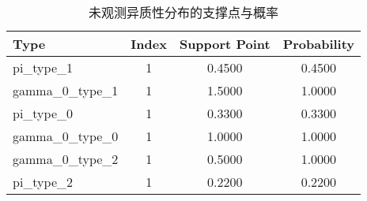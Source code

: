 \begin{table}[htbp]
\centering
\caption{未观测异质性分布的支撑点与概率}
\begin{tabular}{lccc}
\toprule
Type & Index & Support Point & Probability \\
\midrule
pi_type_1 & 1 & 0.4500 & 0.4500 \\
gamma_0_type_1 & 1 & 1.5000 & 1.0000 \\
pi_type_0 & 1 & 0.3300 & 0.3300 \\
gamma_0_type_0 & 1 & 1.0000 & 1.0000 \\
gamma_0_type_2 & 1 & 0.5000 & 1.0000 \\
pi_type_2 & 1 & 0.2200 & 0.2200 \\
\bottomrule
\end{tabular}
\end{table}
